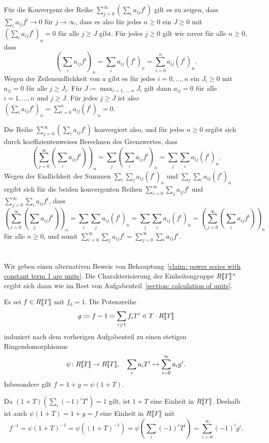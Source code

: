 \documentclass[a4paper, 10pt, numbers=noenddot]{scrartcl}
\begin{document}
Für die Konvergenz der Reihe $\sum_{j=0}^\infty (\sum_i a_{ij} f^i)$ gilt es zu zeigen, dass $\sum_i a_{ij} f^i \to 0$ für $j \to \infty$, dass es also für jedes $n \geq 0$ ein $J \geq 0$ mit $(\sum_i a_{ij} f^i)_n = 0$ für alle $j \geq J$ gibt.
Für jedes $j \geq 0$ gilt wie zuvor für alle $n \geq 0$, dass
\[
    \left( \sum_i a_{ij} f^i \right)_{\!\!\!n}
  = \sum_i a_{ij} (f^i)_n
  = \sum_{i=0}^n a_{ij} (f^i)_n.
\]
Wegen der Zeilenendlichkeit von $a$ gibt es für jedes $i = 0, \dotsc, n$ ein $J_i \geq 0$ mit $a_{ij} = 0$ für alle $j \geq J_i$.
Für $J \coloneqq \max_{i=1, \dotsc, n} J_i$ gilt dann $a_{ij} = 0$ für alle $i = 1, \dotsc, n$ und $j \geq J$.
Für jedes $j \geq J$ ist also $(\sum_i a_{ij} f^i)_n = \sum_{i=0}^n a_{ij} (f^i)_n = 0$.

Die Reihe $\sum_{j=0}^\infty (\sum_i a_{ij} f^i)$ konvergiert also, und für jedes $n \geq 0$ ergibt sich durch koeffizientenweises Berechnen des Grenzwertes, dass
\[
    \left( \sum_{j=0}^\infty \left( \sum_i a_{ij} f^i \right) \right)_{\!\!\!n} 
  = \sum_j \left( \sum_i a_{ij} f^i \right)_{\!\!\!n}
  = \sum_j \sum_i a_{ij} (f^i)_n.
\]
Wegen der Endlichkeit der Summen $\sum_i \sum_j a_{ij} (f^i)_n$ und $\sum_j \sum_i a_{ij} (f^i)_n$ ergibt sich für die beiden konvergenten Reihen $\sum_{i=0}^\infty \sum_j a_{ij} f^i$ und $\sum_{j=0}^\infty \sum_i a_{ij} f^i$, dass
\[
    \left( \sum_{i=0}^\infty \left( \sum_j a_{ij} f^i \right) \right)_{\!\!\!n}
  = \sum_i \sum_j a_{ij} (f^i)_n
  = \sum_j \sum_i a_{ij} (f^i)_n
  = \left( \sum_{j=0}^\infty \left( \sum_i a_{ij} f^i \right) \right)_{\!\!\!n}
\]
für alle $n \geq 0$, und somit $\sum_{i=0}^\infty \sum_j a_{ij} f^i = \sum_{j=0}^\infty \sum_i a_{ij} f^i$.





\section{}

Wir geben einen alternativen Beweis von Behauptung~\ref{claim: power series with constant term 1 are units}.
Die Charakterisierung der Einheitengruppe $R[\![T]\!]^\times$ ergibt sich dann wie im Rest von Aufgabenteil~\ref{section: calculation of units}.

Es sei $f \in R[\![T]\!]$ mit $f_0 = 1$.
Die Potenzreihe
\[
            g
  \coloneqq f-1
  =         \sum_{i \geq 1} f_i T^i
  \in       T \cdot R[\![T]\!]
\]
induziert nach dem vorherigen Aufgabenteil zu einen stetigen Ringendomorphismus
\[
  \psi \colon R[\![T]\!] \to R[\![T]\!],
  \quad
  \sum_i a_i T^i \mapsto \sum_{i=0}^\infty a_i g^i.
\]
Inbesondere gilt $f = 1 + g = \psi(1 + T)$.

Da $(1 + T)(\sum_i (-1)^i T^i) = 1$ gilt, ist $1 + T$ eine Einheit in $R[\![T]\!]$.
Deshalb ist auch $\psi(1 + T) = 1 + g = f$ eine Einheit in $R[\![T]\!]$ mit
\[
    f^{-1}
  = \psi(1 + T)^{-1}
  = \psi\left( (1 + T)^{-1} \right)
  = \psi\left( \sum_i (-1)^i T^i \right)
  = \sum_{i=0}^\infty (-1)^i g^i.
\]
\end{document}
